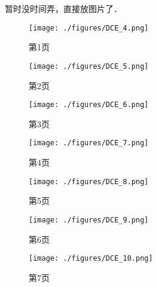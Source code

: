 
\begin{issues}
\issueTODO
\end{issues}

暂时没时间弄，直接放图片了．
\begin{figure}[ht]
\centering
\texttt{[image: ./figures/DCE\_4.png]}
\caption{第1页} \label{DCE_fig4}
\end{figure}
\begin{figure}[ht]
\centering
\texttt{[image: ./figures/DCE\_5.png]}
\caption{第2页} \label{DCE_fig5}
\end{figure}
\begin{figure}[ht]
\centering
\texttt{[image: ./figures/DCE\_6.png]}
\caption{第3页} \label{DCE_fig6}
\end{figure}
\begin{figure}[ht]
\centering
\texttt{[image: ./figures/DCE\_7.png]}
\caption{第4页} \label{DCE_fig7}
\end{figure}
\begin{figure}[ht]
\centering
\texttt{[image: ./figures/DCE\_8.png]}
\caption{第5页} \label{DCE_fig8}
\end{figure}
\begin{figure}[ht]
\centering
\texttt{[image: ./figures/DCE\_9.png]}
\caption{第6页} \label{DCE_fig9}
\end{figure}
\begin{figure}[ht]
\centering
\texttt{[image: ./figures/DCE\_10.png]}
\caption{第7页} \label{DCE_fig10}
\end{figure}
